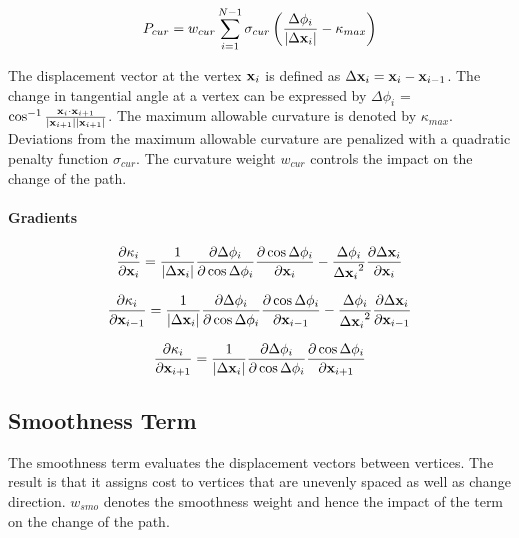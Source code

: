 \begin{equation}
P_{cur} = w_{cur} \displaystyle\sum_{i=1}^{N-1} \sigma_{cur}\left(\frac{\Delta\phi_i}{|\Delta\mathbf{x}_i|} - \kappa_{max}\right)
\end{equation}

The displacement vector at the vertex $\mathbf{x}_i$ is defined as $\Delta\mathbf{x}_i= \mathbf{x}_i - \mathbf{x}_{i-1}$. The change in tangential angle at a vertex can be expressed by $\Delta\phi_i$ = $\cos^{-1}\frac{\mathbf{x}_{i}\cdot\mathbf{x}_{i+1}}{|\mathbf{x}_{i+1}||\mathbf{x}_{i+1}| }$.  The maximum allowable curvature is denoted by $\kappa_{max}$. Deviations from the maximum allowable curvature are penalized with a quadratic penalty function $\sigma_{cur}$. The curvature weight $w_{cur}$  controls the impact on the change of the path.

\paragraph{Gradients}

\begin{equation}
\frac{\partial \kappa_i}{\partial \mathbf{x}_i} = \frac{1}{|\Delta\mathbf{x}_i|}\frac{\partial\Delta\phi_i}{\partial\cos\Delta\phi_i}\frac{\partial\cos\Delta\phi_i}{\partial\mathbf{x}_i}-\frac{\Delta\phi_i}{{\Delta\mathbf{x}_i}^2}\frac{\partial\Delta\mathbf{x}_i}{\partial\mathbf{x}_i}
\end{equation}

\begin{equation}
\frac{\partial \kappa_i}{\partial \mathbf{x}_{i-1}} = \frac{1}{|\Delta\mathbf{x}_i|}\frac{\partial\Delta\phi_i}{\partial\cos\Delta\phi_i}\frac{\partial\cos\Delta\phi_i}{\partial\mathbf{x}_{i-1}}-\frac{\Delta\phi_i}{{\Delta\mathbf{x}_i}^2}\frac{\partial\Delta\mathbf{x}_i}{\partial\mathbf{x}_{i-1}}
\end{equation}

\begin{equation}
\frac{\partial \kappa_i}{\partial \mathbf{x}_{i+1}} = \frac{1}{|\Delta\mathbf{x}_i|}\frac{\partial\Delta\phi_i}{\partial\cos\Delta\phi_i}\frac{\partial\cos\Delta\phi_i}{\partial\mathbf{x}_{i+1}}
\end{equation}

\subsection{Smoothness Term}
The smoothness term evaluates the displacement vectors between vertices. The result is that it assigns cost to vertices that are unevenly spaced as well as change direction. $w_{smo}$ denotes the smoothness weight and hence the impact of the term on the change of the path.

